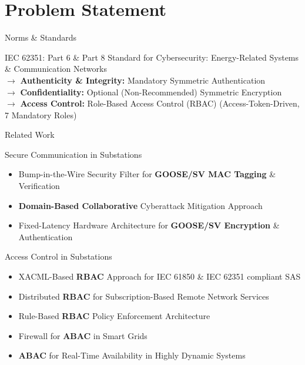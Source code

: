 \documentclass[en]{sdqbeamer}
\begin{document}
\section{Problem Statement}
\begin{frame}{Norms \& Standards}
    \begin{blueblock}{IEC 62351: Part 6 \& Part 8 \parencite*{IEC62351P6,IEC62351P8}}
        Standard for Cybersecurity: Energy-Related Systems \& Communication Networks
        \\$\rightarrow$ \textbf{Authenticity \& Integrity:} Mandatory Symmetric Authentication
        \\$\rightarrow$ \textbf{Confidentiality:} Optional (Non-Recommended) Symmetric Encryption
        \\$\rightarrow$ \textbf{Access Control:} Role-Based Access Control (RBAC) (Access-Token-Driven, 7 Mandatory Roles)
    \end{blueblock}
\end{frame}
\begin{frame}{Related Work}
    \begin{blueblock}{Secure Communication in Substations}
        \begin{itemize}
            \item Bump-in-the-Wire Security Filter for \textbf{GOOSE/SV MAC Tagging} \& Verification \parencite{Ishchenko2018}
            \item \textbf{Domain-Based Collaborative} Cyberattack Mitigation Approach \parencite{Hong2019}
            \item Fixed-Latency Hardware Architecture for \textbf{GOOSE/SV Encryption} \& Authentication \parencite{Rodriguez2021}
        \end{itemize}
    \end{blueblock}

    \begin{blueblock}{Access Control in Substations}
        \begin{itemize}
            \item XACML-Based \textbf{RBAC} Approach for IEC 61850 \& IEC 62351 compliant SAS \parencite{Lee2015}
            \item Distributed \textbf{RBAC} for Subscription-Based Remote Network Services \parencite{Ma2006} %
            \item Rule-Based \textbf{RBAC} Policy Enforcement Architecture \parencite{Alcaraz2016} %
            \item Firewall for \textbf{ABAC} in Smart Grids \parencite{Ruland2018}
            \item \textbf{ABAC} for Real-Time Availability in Highly Dynamic Systems \parencite{Burmester2013}
        \end{itemize}
    \end{blueblock}
\end{frame}
\end{document}
